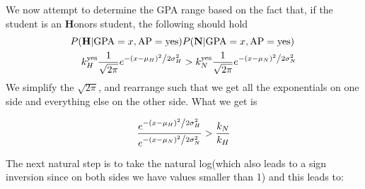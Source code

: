 \documentclass{article}
\begin{document}
We now attempt to determine the GPA range based on the fact that, if the student is an \textbf{H}onors student, the following should hold
\begin{align*}
P(\mathbf{H} | \text{GPA}=x, \text{AP}=\text{yes}) & P(\mathbf{N} | \text{GPA}=x, \text{AP}=\text{yes}) \\
k_H^\text{yes} \frac{1}{{\sqrt {2\pi } }}e^{{{ - \left( {x - \mu_H } \right)^2 } \mathord{\left/ {\vphantom {{ - \left( {x - \mu_H } \right)^2 } {2\sigma_{H} ^2 }}} \right. \kern-\nulldelimiterspace} {2\sigma_{H} ^2 }}} &> k_N^\text{yes}\frac{1}{{ \sqrt {2\pi } }}e^{{{ - \left( {x - \mu_N } \right)^2 } \mathord{\left/ {\vphantom {{ - \left( {x - \mu_N } \right)^2 } {2\sigma_{N} ^2 }}} \right. \kern-\nulldelimiterspace} {2\sigma_{N} ^2 }}} 
\end{align*}
We simplify the $\sqrt{2\pi}$, and rearrange such that we get all the exponentials on one side and everything else on the other side. What we get is

\[
\frac{e^{{{ - \left( {x - \mu_H } \right)^2 } \mathord{\left/ {\vphantom {{ - \left( {x - \mu_H } \right)^2 } {2\sigma_{H} ^2 }}} \right. \kern-\nulldelimiterspace} {2\sigma_{H} ^2 }}}}{e^{{{ - \left( {x - \mu_N } \right)^2 } \mathord{\left/ {\vphantom {{ - \left( {x - \mu_N } \right)^2 } {2\sigma_{N} ^2 }}} \right. \kern-\nulldelimiterspace} {2\sigma_{N} ^2 }}}} > \frac{k_N}{k_H}
\]

The next natural step is to take the natural log(which also leads to a sign inversion since on both sides we have values smaller than 1) and this leads to:
\end{document}
